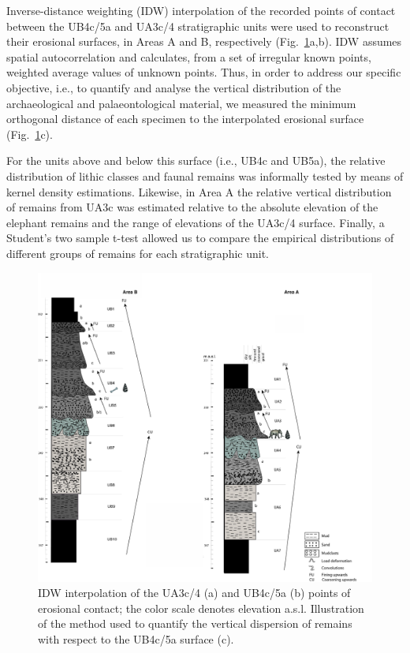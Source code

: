 \documentclass[review,authoryear,times]{elsarticle} %
\begin{document}
Inverse-distance weighting (IDW) interpolation of the recorded points of contact between the UB4c/5a and UA3c/4 stratigraphic units were used to reconstruct their erosional surfaces, in Areas A and B, respectively (Fig.~\ref{fig:3}a,b). IDW assumes spatial autocorrelation and calculates, from a set of irregular known points, weighted average values of unknown points. Thus, in order to address our specific objective, i.e., to quantify and analyse the vertical distribution of the archaeological and palaeontological material, we measured the minimum orthogonal distance of each specimen to the interpolated erosional surface (Fig.~\ref{fig:3}c).

For the units above and below this surface (i.e., UB4c and UB5a), the relative distribution of lithic classes and faunal remains was informally tested by means of kernel density estimations. Likewise, in Area A the relative vertical distribution of remains from UA3c was estimated relative to the absolute elevation of the elephant remains and the range of elevations of the UA3c/4 surface. Finally, a Student's two sample t-test allowed us to compare the empirical distributions of different groups of remains for each stratigraphic unit.

\begin{figure}[]
  \centering
  \includegraphics[width=1\textwidth]{../artwork/Fig3.pdf}
  \caption{IDW interpolation of the UA3c/4 (a) and UB4c/5a (b) points of erosional contact; the color scale denotes elevation a.s.l. Illustration of the method used to quantify the vertical dispersion of remains with respect to the UB4c/5a surface (c).}
  \label{fig:3}
\end{figure}
\end{document}
